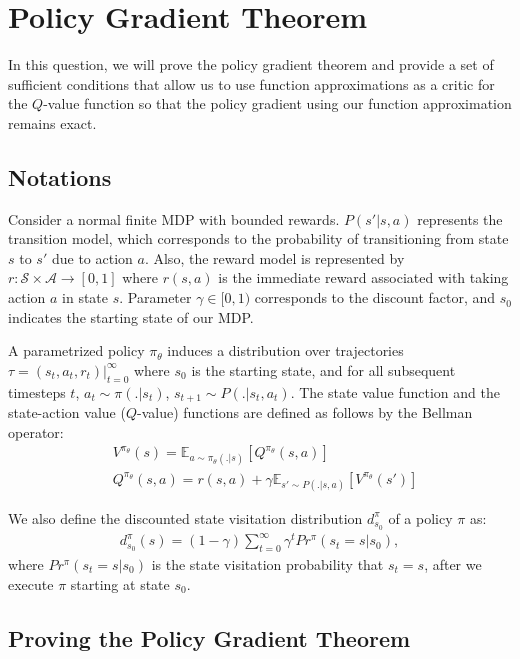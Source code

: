 \section{Policy Gradient Theorem}

In this question, we will prove the policy gradient theorem and provide a set of sufficient conditions that allow us to use function approximations as a critic for the $Q$-value function so that the policy gradient using our function approximation remains exact.

\subsection{Notations}

Consider a normal finite MDP with bounded rewards. $P(s'|s, a)$ represents the transition model, which corresponds to the probability of transitioning from state $s$ to $s'$ due to action $a$. Also, the reward model is represented by $r: \mathcal{S}\times\mathcal{A}\xrightarrow{}[0, 1]$ where $r(s, a)$ is the immediate reward associated with taking action $a$ in state $s$. Parameter $\gamma \in [0, 1)$ corresponds to the discount factor, and $s_0$ indicates the starting state of our MDP. 

A parametrized policy $\pi_{\theta}$ induces a distribution over trajectories $\tau = (s_t, a_t, r_t)|_{t = 0}^\infty$ where $s_0$ is the starting state, and for all subsequent timesteps $t$, $a_t \sim \pi(.|s_t)$, $s_{t + 1}\sim P(.|s_t, a_t)$. The state value function and the state-action value ($Q$-value) functions are defined as follows by the Bellman operator:
\begin{align*}
    &V^{\pi_\theta}(s) = \mathbb{E}_{a\sim \pi_\theta(.|s)} [Q^{\pi_\theta}(s,a)]\\
    &Q^{\pi_\theta}(s,a) = r(s, a) + \gamma\mathbb{E}_{s'\sim P(.|s, a)} [V^{\pi_\theta}(s')] 
\end{align*}

We also define the discounted state visitation distribution $d^{\pi}_{s_0}$ of a policy $\pi$ as:
\begin{align}
    d^{\pi}_{s_0}(s) = (1-\gamma)\sum_{t = 0}^{\infty}\gamma^t Pr^{\pi}(s_t = s|s_0),
\end{align}
where $Pr^{\pi}(s_t = s|s_0)$ is the state visitation probability that $s_t = s$, after we execute $\pi$ starting at state $s_0$.

\subsection{Proving the Policy Gradient Theorem}

